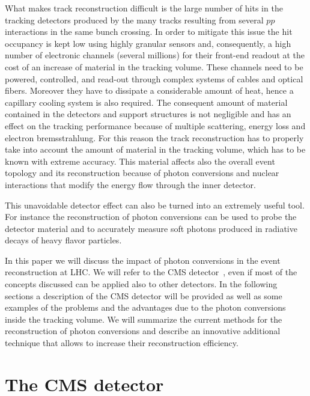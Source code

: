 \documentclass[a4paper]{jpconf}
\begin{document}
What makes  track reconstruction difficult is  
the large number of hits in the tracking detectors
produced by the many tracks resulting from several $pp$ interactions in the same bunch crossing. In order to mitigate this issue the hit occupancy is kept low using highly granular sensors and, consequently, a high number of electronic channels (several millions) for their front-end readout at the cost of an increase of material in the tracking volume. These channels need to be powered, controlled, and read-out through  complex systems of cables and optical fibers. Moreover they have to dissipate a considerable amount of heat, hence a capillary cooling system is also required.
The consequent amount of material  contained in the detectors and support structures
is not negligible and has an effect on the tracking performance because of multiple scattering, energy loss and electron bremsstrahlung. 
For this reason the track reconstruction has to properly take into account the amount of material in the tracking volume, which has to be known with extreme accuracy.  
This material  affects also the overall event topology and its reconstruction because of photon conversions and nuclear interactions that modify the energy flow through the inner detector.

This unavoidable detector effect   can also be turned into an extremely useful tool. For instance the reconstruction of photon conversions can be used to probe the detector material and to accurately measure soft photons produced in radiative decays of heavy flavor particles. %
 
In this paper we will discuss the impact of  photon conversions in the event reconstruction at LHC.  We will refer to the CMS detector~\cite{JINST}, even if most of the concepts discussed can be applied also to other detectors. 
In the following sections a description of the CMS detector will be provided as well as some examples of the  problems and the advantages due to the photon conversions inside the tracking volume.
We will summarize the current methods for the reconstruction of photon conversions and describe an innovative additional technique that allows to increase their reconstruction efficiency.


\section{The CMS detector}
\end{document}
